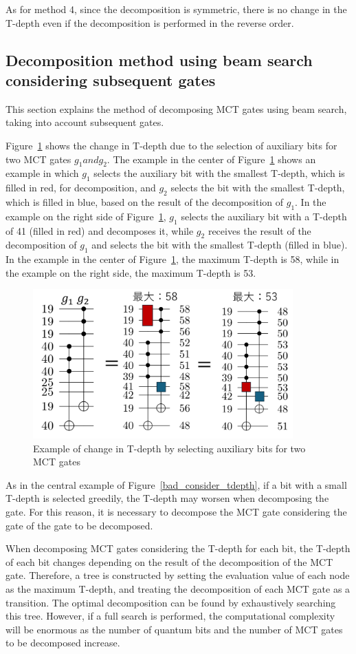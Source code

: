 As for method 4, since the decomposition is symmetric, there is no change in the T-depth even if the decomposition is performed in the reverse order.
\subsection{Decomposition method using beam search considering subsequent gates}
This section explains the method of decomposing MCT gates using beam search, taking into account subsequent gates.

Figure~\ref{select_ancilla_tdepth} shows the change in T-depth due to the selection of auxiliary bits for two MCT gates $g_{1} and g_{2}$.
The example in the center of Figure~\ref{select_ancilla_tdepth} shows an example in which $g_{1}$ selects the auxiliary bit with the smallest T-depth, which is filled in red, for decomposition, and $g_{2}$ selects the bit with the smallest T-depth, which is filled in blue, based on the result of the decomposition of $g_{1}$.
In the example on the right side of Figure~\ref{select_ancilla_tdepth},
$g_{1}$ selects the auxiliary bit with a T-depth of 41 (filled in red) and decomposes it,
while $g_{2}$ receives the result of the decomposition of $g_{1}$ and selects the bit with the smallest T-depth (filled in blue).
In the example in the center of Figure~\ref{select_ancilla_tdepth},
the maximum T-depth is 58,
while in the example on the right side,
the maximum T-depth is 53.
\begin{figure}[tbp]
\centering
\includegraphics[width=10cm]{img/select_ancilla_biit_tdepth.pdf}
\caption{Example of change in T-depth by selecting auxiliary bits for two MCT gates}
\label{select_ancilla_tdepth}
\end{figure}
As in the central example of Figure~\ref{bad_consider_tdepth},
if a bit with a small T-depth is selected greedily,
the T-depth may worsen when decomposing the  gate.
For this reason, it is necessary to decompose the MCT gate considering the  gate of the gate to be decomposed.
\par
When decomposing MCT gates considering the T-depth for each bit,
the T-depth of each bit changes depending on the result of the decomposition of the MCT gate.
Therefore, a tree is constructed by setting the evaluation value of each node as the maximum T-depth,
and treating the decomposition of each MCT gate as a transition.
The optimal decomposition can be found by exhaustively searching this tree.
However, if a full search is performed, the computational complexity will be enormous as the number of quantum bits and the number of MCT gates to be decomposed increase.

